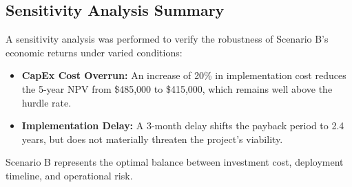 \subsection{Sensitivity Analysis Summary}
A sensitivity analysis was performed to verify the robustness of Scenario B's economic returns under varied conditions:
\begin{itemize}[leftmargin=1.5em]
  \item \textbf{CapEx Cost Overrun:} An increase of 20\% in implementation cost reduces the 5-year NPV from \$485,000 to \$415,000, which remains well above the hurdle rate.
  \item \textbf{Implementation Delay:} A 3-month delay shifts the payback period to 2.4 years, but does not materially threaten the project's viability.
\end{itemize}
Scenario B represents the optimal balance between investment cost, deployment timeline, and operational risk.
